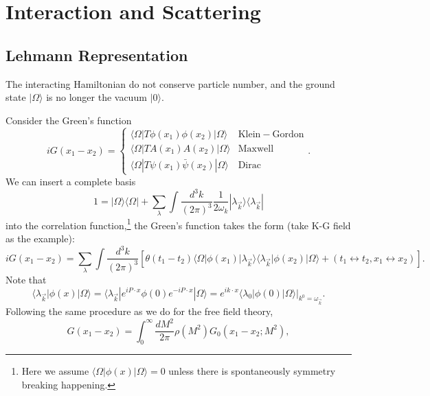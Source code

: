 \section{Interaction and Scattering}

\subsection{Lehmann Representation}
The interacting Hamiltonian do not conserve particle number, and the ground state $|\Omega\rangle$ is no longer the vacuum $|0\rangle$.

Consider the Green's function
\begin{equation*}
	iG(x_1-x_2) = \begin{cases}
		\langle\Omega|T\phi(x_1)\phi(x_2)|\Omega\rangle & \mathrm{Klein-Gordon} \\
		\langle\Omega|T A(x_1)A(x_2)|\Omega\rangle & \mathrm{Maxwell} \\
		\langle\Omega|T\psi(x_1)\bar\psi(x_2)|\Omega\rangle & \mathrm{Dirac}
	\end{cases}.
\end{equation*}
We can insert a complete basis 
\begin{equation*}
	1 = |\Omega\rangle\langle\Omega| + \sum_\lambda\int\frac{d^3 k}{(2\pi)^3}\frac{1}{2\omega_k}|\lambda_{\vec k}\rangle \langle\lambda_{\vec k}|
\end{equation*}
into the correlation function,\footnote{Here we assume $\langle\Omega|\phi(x)|\Omega\rangle=0$ unless there is spontaneously symmetry breaking happening.} the Green's function takes the form (take K-G field as the example):
\begin{equation*}
	iG(x_1-x_2) = \sum_\lambda \int\frac{d^3 k}{(2\pi)^3}
	\left[\theta(t_1-t_2)\langle\Omega|\phi(x_1)|\lambda_{\vec k}\rangle\langle\lambda_{\vec k}|\phi(x_2)|\Omega\rangle + (t_1\leftrightarrow t_2, x_1 \leftrightarrow x_2)\right].
\end{equation*}
Note that
\begin{equation*}
	\langle\lambda_{\vec k}|\phi(x)|\Omega\rangle 
	= \langle\lambda_{\vec k}|e^{iP\cdot x}\phi(0) e^{-iP\cdot x}|\Omega\rangle
	= e^{ik\cdot x} \left.\langle\lambda_{0}|\phi(0)|\Omega\rangle\right|_{k^0=\omega_{\vec k}}.
\end{equation*}
Following the same procedure as we do for the free field theory, 
\begin{equation}
	G(x_1-x_2) = \int_0^\infty \frac{dM^2}{2\pi} \rho(M^2) G_0(x_1-x_2;M^2),
\end{equation}
